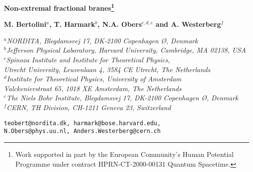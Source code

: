\documentclass[a4paper,11pt]{article}
\begin{document}
\renewcommand{\thefootnote}{\fnsymbol{footnote}}
\setcounter{footnote}{1}

\begin{titlepage}

\vspace*{-10ex}


\vspace{7ex}

\begin{center}

{\LARGE \bf Non-extremal fractional branes\footnote{Work supported in
part by the European Community's Human Potential Programme under
contract  HPRN-CT-2000-00131 Quantum Spacetime.}}

\vspace{8ex}

{\large \bf M. Bertolini${}^a$, T. Harmark${}^{b}$,
N.A. Obers${}^{c,d,e}$  and A. Westerberg${}^{f}$}

\vspace{4ex}

{\it ${}^a$NORDITA, Blegdamsvej 17, DK-2100 Copenhagen \O,
Denmark\\[.75ex] ${}^b$Jefferson Physical Laboratory, Harvard
University, Cambridge, MA 02138, USA \\[.75ex] ${}^c$Spinoza Institute
and Institute for Theoretical Physics,\\[-.3ex] Utrecht University,
Leuvenlaan 4, 3584 CE Utrecht, The Netherlands \\[.75ex]
${}^d$Institute for Theoretical Physics, University of Amsterdam
\\[-.3ex] Valckenierstraat 65, 1018 XE Amsterdam, The Netherlands
\\[.75ex] $^e$The Niels Bohr Institute, Blegdamsvej 17, DK-2100 
Copenhagen \O, Denmark
\\[.75ex] ${}^f$CERN, TH Division, CH-1211 Geneva 23, Switzerland}

\vspace*{3ex}

{\small\tt teobert@nordita.dk, harmark@bose.harvard.edu,\\[-.75ex]
N.Obers@phys.uu.nl, Anders.Westerberg@cern.ch}

\end{center}


\end{titlepage}
\end{document}

